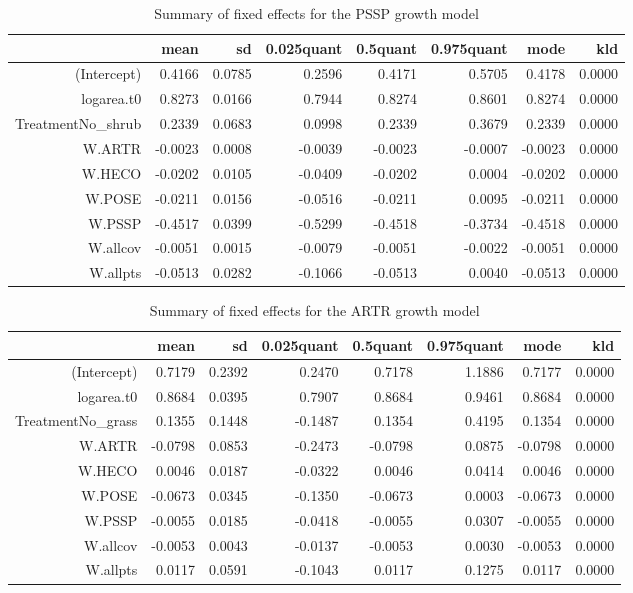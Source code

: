 \begin{table}[ht]
\centering
\caption{Summary of fixed effects for the PSSP growth model} 
\label{PSSPgrowth}
\begin{tabular}{rrrrrrrr}
  \hline
 & mean & sd & 0.025quant & 0.5quant & 0.975quant & mode & kld \\ 
  \hline
(Intercept) & 0.4166 & 0.0785 & 0.2596 & 0.4171 & 0.5705 & 0.4178 & 0.0000 \\ 
  logarea.t0 & 0.8273 & 0.0166 & 0.7944 & 0.8274 & 0.8601 & 0.8274 & 0.0000 \\ 
  TreatmentNo\_shrub & 0.2339 & 0.0683 & 0.0998 & 0.2339 & 0.3679 & 0.2339 & 0.0000 \\ 
  W.ARTR & -0.0023 & 0.0008 & -0.0039 & -0.0023 & -0.0007 & -0.0023 & 0.0000 \\ 
  W.HECO & -0.0202 & 0.0105 & -0.0409 & -0.0202 & 0.0004 & -0.0202 & 0.0000 \\ 
  W.POSE & -0.0211 & 0.0156 & -0.0516 & -0.0211 & 0.0095 & -0.0211 & 0.0000 \\ 
  W.PSSP & -0.4517 & 0.0399 & -0.5299 & -0.4518 & -0.3734 & -0.4518 & 0.0000 \\ 
  W.allcov & -0.0051 & 0.0015 & -0.0079 & -0.0051 & -0.0022 & -0.0051 & 0.0000 \\ 
  W.allpts & -0.0513 & 0.0282 & -0.1066 & -0.0513 & 0.0040 & -0.0513 & 0.0000 \\ 
   \hline
\end{tabular}
\end{table}

\begin{table}[ht]
\centering
\caption{Summary of fixed effects for the ARTR growth model} 
\label{ARTRgrowth}
\begin{tabular}{rrrrrrrr}
  \hline
 & mean & sd & 0.025quant & 0.5quant & 0.975quant & mode & kld \\ 
  \hline
(Intercept) & 0.7179 & 0.2392 & 0.2470 & 0.7178 & 1.1886 & 0.7177 & 0.0000 \\ 
  logarea.t0 & 0.8684 & 0.0395 & 0.7907 & 0.8684 & 0.9461 & 0.8684 & 0.0000 \\ 
  TreatmentNo\_grass & 0.1355 & 0.1448 & -0.1487 & 0.1354 & 0.4195 & 0.1354 & 0.0000 \\ 
  W.ARTR & -0.0798 & 0.0853 & -0.2473 & -0.0798 & 0.0875 & -0.0798 & 0.0000 \\ 
  W.HECO & 0.0046 & 0.0187 & -0.0322 & 0.0046 & 0.0414 & 0.0046 & 0.0000 \\ 
  W.POSE & -0.0673 & 0.0345 & -0.1350 & -0.0673 & 0.0003 & -0.0673 & 0.0000 \\ 
  W.PSSP & -0.0055 & 0.0185 & -0.0418 & -0.0055 & 0.0307 & -0.0055 & 0.0000 \\ 
  W.allcov & -0.0053 & 0.0043 & -0.0137 & -0.0053 & 0.0030 & -0.0053 & 0.0000 \\ 
  W.allpts & 0.0117 & 0.0591 & -0.1043 & 0.0117 & 0.1275 & 0.0117 & 0.0000 \\ 
   \hline
\end{tabular}
\end{table}

